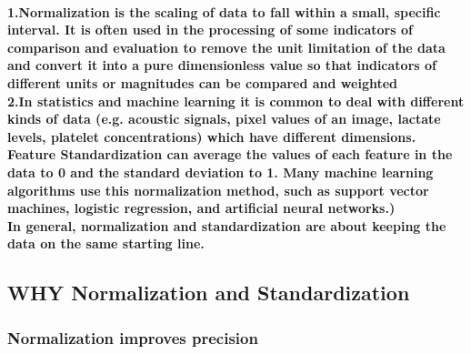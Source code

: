 \documentclass{article}
\begin{document}
\paragraph{1.Normalization is the scaling of data to fall within a small, specific interval. It is often used in the processing of some indicators of comparison and evaluation to remove the unit limitation of the data and convert it into a pure dimensionless value so that indicators of different units or magnitudes can be compared and weighted
\\2.In statistics and machine learning it is common to deal with different kinds of data (e.g. acoustic signals, pixel values of an image, lactate levels, platelet concentrations) which have different dimensions.
Feature Standardization can average the values of each feature in the data to 0 and the standard deviation to 1. Many machine learning algorithms use this normalization method, such as support vector machines, logistic regression, and artificial neural networks.)\\

In general, normalization and standardization are about keeping the data on the same starting line.}


\subsection{\huge WHY Normalization and Standardization}
\subsubsection{Normalization improves precision}
\end{document}
